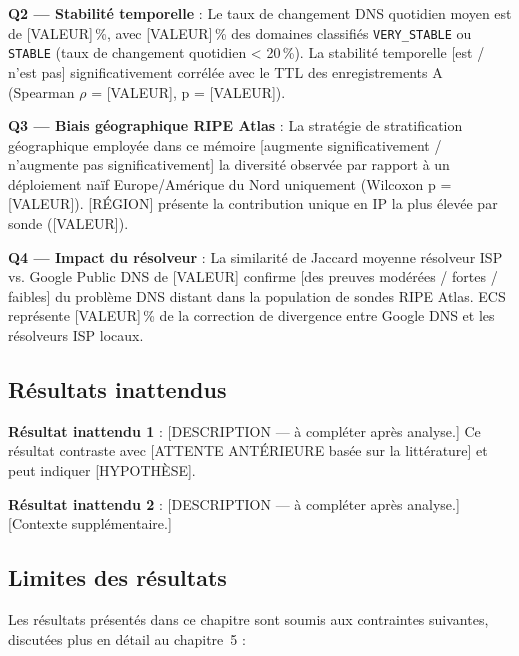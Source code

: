 \textbf{Q2 --- Stabilité temporelle} : Le taux de changement DNS quotidien moyen est de [VALEUR]\,\%, avec [VALEUR]\,\% des domaines classifiés \texttt{VERY\_STABLE} ou \texttt{STABLE} (taux de changement quotidien < 20\,\%). La stabilité temporelle [est / n'est pas] significativement corrélée avec le TTL des enregistrements A (Spearman $\rho$ = [VALEUR], p = [VALEUR]).

\textbf{Q3 --- Biais géographique RIPE Atlas} : La stratégie de stratification géographique employée dans ce mémoire [augmente significativement / n'augmente pas significativement] la diversité observée par rapport à un déploiement naïf Europe/Amérique du Nord uniquement (Wilcoxon p = [VALEUR]). [RÉGION] présente la contribution unique en IP la plus élevée par sonde ([VALEUR]).

\textbf{Q4 --- Impact du résolveur} : La similarité de Jaccard moyenne résolveur ISP vs. Google Public DNS de [VALEUR] confirme [des preuves modérées / fortes / faibles] du problème DNS distant dans la population de sondes RIPE Atlas. ECS représente [VALEUR]\,\% de la correction de divergence entre Google DNS et les résolveurs ISP locaux.

\subsection{Résultats inattendus}
\label{subsec:4.6.2}

\textbf{Résultat inattendu 1} : [DESCRIPTION --- à compléter après analyse.] Ce résultat contraste avec [ATTENTE ANTÉRIEURE basée sur la littérature] et peut indiquer [HYPOTHÈSE].

\textbf{Résultat inattendu 2} : [DESCRIPTION --- à compléter après analyse.] [Contexte supplémentaire.]

\subsection{Limites des résultats}
\label{subsec:4.6.3}

Les résultats présentés dans ce chapitre sont soumis aux contraintes suivantes, discutées plus en détail au chapitre~5 :

